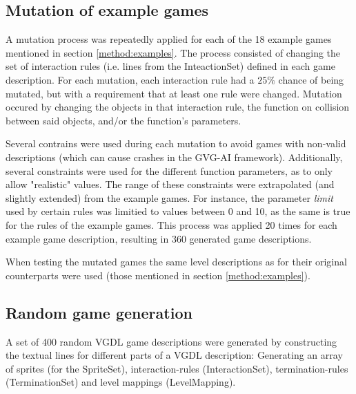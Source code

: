 \documentclass[a4paper,titlepage,final, twoside]{report}
\begin{document}



\subsection{Mutation of example games}
\label{method:mutation}
A mutation process was repeatedly applied for each of the 18 example games mentioned in section \ref{method:examples}. 
The process consisted of changing the set of interaction rules (i.e. lines from the InteactionSet) defined in each game description.
For each mutation, each interaction rule had a $25\%$ chance of being mutated, but with a requirement that at least one rule were changed. 
Mutation occured by changing the objects in that interaction rule, the function on collision between said objects, and/or the function's parameters.

Several contrains were used during each mutation to avoid games with non-valid descriptions (which can cause crashes in the GVG-AI framework).
Additionally, several constraints were used for the different function parameters, as to only allow "realistic" values. 
The range of these constraints were extrapolated (and slightly extended) from the example games. 
For instance, the parameter \emph{limit} used by certain rules was limitied to values between 0 and 10, as the same is true for the rules of the example games. 
This process was applied 20 times for each example game description, resulting in 360 generated game descriptions.

When testing the mutated games the same level descriptions as for their original counterparts were used (those mentioned in section \ref{method:examples}).




\subsection{Random game generation}
\label{method:random}

A set of 400 random VGDL game descriptions were generated by constructing the textual lines for different parts of a VGDL description: Generating an array of sprites (for the SpriteSet), interaction-rules (InteractionSet), termination-rules (TerminationSet) and level mappings (LevelMapping).
\end{document}
